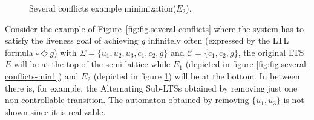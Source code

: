 \begin{figure}[bt]
\centering
\SmallPicture
{}
\caption{Several conflicts example minimization($E_2$).}
\label{fig:fig.several-conflicts-min2}
\MediumPicture
\end{figure}

Consider the example of Figure~\ref{fig:fig.several-conflicts} where the system has to satisfy the liveness goal of
achieving $g$ infinitely often (expressed
by the LTL formula $\square \Diamond g$)
with $\Sigma = \{u_1, u_2, u_3, c_1, c_2, g\}$ and 
$\mathcal{C} = \{c_1, c_2, g\}$, the original LTS $E$ will be
at the top of the semi lattice while $E_1$ (depicted in figure \ref{fig:fig.several-conflicts-min1}) and $E_2$ (depicted in 
figure \ref{fig:fig.several-conflicts-min2}) will be at 
the bottom.  In between there is, for example, the Alternating Sub-LTSs
obtained by removing just one non controllable transition.  
The automaton obtained by removing $\{u_1, u_3\}$ is not shown
since it is realizable. 
%
%
%

 
